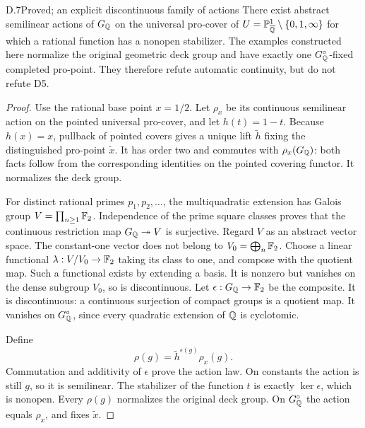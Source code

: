\begin{claim}{D.7}{Proved; an explicit discontinuous family of actions}
There exist abstract semilinear actions of $G_\mathbb Q$ on the universal
pro-cover of $U=\mathbb P^1_{\overline{\mathbb Q}}\setminus\{0,1,\infty\}$
for which a rational function has a nonopen stabilizer. The examples
constructed here normalize the original geometric deck group and
have exactly one $G_\mathbb Q^\circ$-fixed completed pro-point. They
therefore refute automatic continuity, but do not refute D5.
\end{claim}
\begin{proof}
Use the rational base point $x=1/2$. Let $\rho_x$ be its continuous
semilinear action on the pointed universal pro-cover, and let
$h(t)=1-t$. Because $h(x)=x$, pullback of pointed covers gives a
unique lift $\widetilde h$ fixing the distinguished pro-point
$\widetilde x$. It has order two and commutes with $\rho_x(G_\mathbb Q)$:
both facts follow from the corresponding identities on the
pointed covering functor. It normalizes the deck group.

For distinct rational primes $p_1,p_2,\ldots$, the multiquadratic
extension has Galois group $V=\prod_{n\geq1}\mathbb F_2$. Independence
of the prime square classes proves that the continuous restriction
map $G_\mathbb Q\twoheadrightarrow V$ is surjective. Regard $V$ as an
abstract vector space. The constant-one vector does not belong to
$V_0=\bigoplus_n\mathbb F_2$. Choose a linear functional
$\lambda:V/V_0\to\mathbb F_2$ taking its class to one, and compose
with the quotient map. Such a functional exists by extending a
basis. It is nonzero but vanishes on the dense subgroup $V_0$,
so is discontinuous. Let $\epsilon:G_\mathbb Q\to\mathbb F_2$ be the composite.
It is discontinuous: a continuous surjection of compact groups is
a quotient map. It vanishes on $G_\mathbb Q^\circ$, since every quadratic
extension of $\mathbb Q$ is cyclotomic.

Define
\[
       \rho(g)=\widetilde h^{\epsilon(g)}\rho_x(g).
\]
Commutation and additivity of $\epsilon$ prove the action law.
On constants the action is still $g$, so it is semilinear.
The stabilizer of the function $t$ is exactly $\ker\epsilon$,
which is nonopen. Every $\rho(g)$ normalizes the original deck
group. On $G_\mathbb Q^\circ$ the action equals $\rho_x$, and fixes
$\widetilde x$.


\end{proof}

